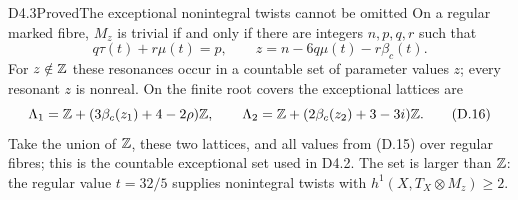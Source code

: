 \begin{claim}{D4.3}{Proved}{The exceptional nonintegral twists cannot be omitted}
On a regular marked fibre, $M_z$ is trivial if and only if there are
integers $n,p,q,r$ such that
\[
 q\tau(t)+r\mu(t)=p,\qquad
 z=n-6q\mu(t)-r\beta_c(t).                             \tag{D.15}
\]
For $z\notin\mathbb Z$ these resonances occur in a countable set of parameter
values $z$; every resonant $z$ is nonreal. On the finite root covers
the exceptional lattices are
\[
 \Lambda_1=\mathbb Z+(3\beta_c(z_1)+4-2\rho)\mathbb Z,\qquad
 \Lambda_2=\mathbb Z+(2\beta_c(z_2)+3-3i)\mathbb Z.                  \tag{D.16}
\]
Take the union of $\mathbb Z$, these two lattices, and all values from (D.15)
over regular fibres; this is the countable exceptional set used in
D4.2. The set is larger than $\mathbb Z$: the regular value $t=32/5$
supplies nonintegral twists with $h^1(X,T_X\otimes M_z)\ge2$.
\end{claim}
